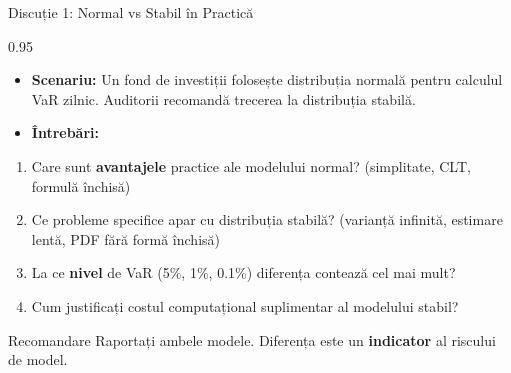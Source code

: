 \documentclass[9pt, aspectratio=169, t]{beamer}
\begin{document}
\begin{frame}{Discuție 1: Normal vs Stabil în Practică}
\begin{cminipage}{0.95\textwidth}
    \begin{itemize}\setlength{\itemsep}{0pt}
        \item \textbf{Scenariu:} Un fond de investiții folosește distribuția normală pentru calculul VaR zilnic. Auditorii recomandă trecerea la distribuția stabilă.
        \item \textbf{Întrebări:}
    \end{itemize}
    \begin{enumerate}\setlength{\itemsep}{0pt}
        \item Care sunt \textbf{avantajele} practice ale modelului normal? (simplitate, CLT, formulă închisă)
        \item Ce probleme specifice apar cu distribuția stabilă? (varianță infinită, estimare lentă, PDF fără formă închisă)
        \item La ce \textbf{nivel} de VaR (5\%, 1\%, 0.1\%) diferența contează cel mai mult?
        \item Cum justificați costul computațional suplimentar al modelului stabil?
    \end{enumerate}

    \vspace{0.2cm}
    \begin{block}{Recomandare}
        {\small Raportați ambele modele. Diferența este un \textbf{indicator} al riscului de model.}
    \end{block}
\end{cminipage}
\end{frame}
\end{document}
